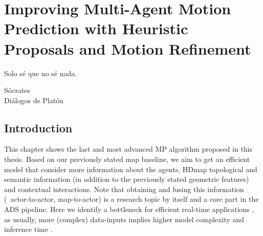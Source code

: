 % 
% 
% 
% 
% 
% 
% 

\chapter{Improving Multi-Agent Motion Prediction with Heuristic Proposals and Motion Refinement}
\label{cha:improving_multi_agent}

\begin{FraseCelebre}
	\begin{Frase}
		Solo sé que no sé nada.
	\end{Frase}
	\begin{Fuente}
		Sócrates \\
		Diálogos de Platón
	\end{Fuente}
\end{FraseCelebre}

\section{Introduction}
\label{sec:7_introduction}

This chapter shows the last and most advanced \ac{MP} algorithm proposed in this thesis. Based on our previously stated map baseline, we aim to get an efficient model that consider more information about the agents, \ac{HDmap} topological and semantic information (in addition to the previously stated geometric features) and contextual interactions. Note that obtaining and fusing this information (\eg \ actor-to-actor, map-to-actor) is a research topic by itself \cite{varadarajan2022multipath++, zeng2021lanercnn, liang2020learning} and a core part in the \ac{ADS} pipeline. Here we identify a bottleneck for efficient real-time applications \cite{KATRAKAZAS2015416realtime, gomez2021smartmot}, as usually, more (complex) data-inputs implies higher model complexity and inference time \cite{gao2020vectornet}. 

